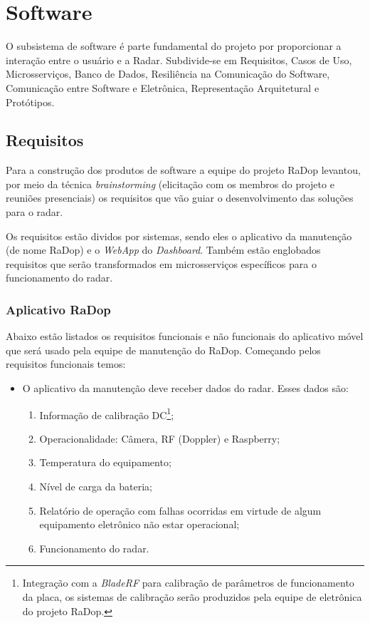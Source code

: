 \chapter{Software}

O subsistema de software é parte fundamental do projeto por proporcionar a interação entre o usuário e a Radar. Subdivide-se em Requisitos, Casos de Uso, Microsserviços, Banco de Dados, Resiliência na Comunicação do Software, Comunicação entre Software e Eletrônica, Representação Arquitetural e Protótipos. 

\section{Requisitos}\nopagebreak

Para a construção dos produtos de software a equipe do projeto RaDop levantou, por meio da técnica \textit{brainstorming} (elicitação com os membros do projeto e reuniões presenciais) os requisitos que vão guiar o desenvolvimento das soluções para o radar.

Os requisitos estão dividos por sistemas, sendo eles o aplicativo da manutenção (de nome RaDop) e o \textit{WebApp} do \textit{Dashboard}. Também estão englobados requisitos que serão transformados em microsserviços específicos para o funcionamento do radar.

\subsection{Aplicativo RaDop}

Abaixo estão listados os requisitos funcionais e não funcionais do aplicativo móvel que será usado pela equipe de manutenção do RaDop. Começando pelos requisitos funcionais temos:


\begin{itemize} 
  \item O aplicativo da manutenção deve receber dados do radar. Esses dados são:
  \begin{enumerate}
    \item Informação de calibração DC\footnote{Integração com a \textit{BladeRF} para calibração de parâmetros de funcionamento da placa, os sistemas de calibração serão produzidos pela equipe de eletrônica do projeto RaDop.};
    \item Operacionalidade: Câmera, RF (Doppler) e Raspberry;
    \item Temperatura do equipamento;
    \item Nível de carga da bateria;
    \item Relatório de operação com falhas ocorridas em virtude de algum equipamento eletrônico não estar operacional;
    \item Funcionamento do radar.
  \end{enumerate}
\end{itemize}


